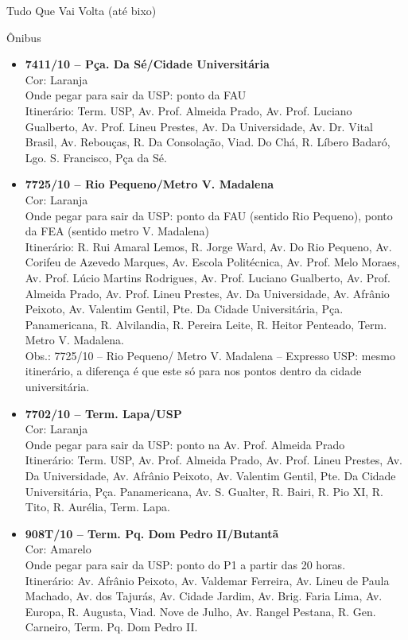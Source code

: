 \begin{secao}{Tudo Que Vai Volta (até bixo)}
\begin{subsecao}{Ônibus}
\begin{itemize}
	\item {\bf 7411/10 – Pça. Da Sé/Cidade Universitária}\\
	Cor: Laranja\\
	Onde pegar para sair da USP: ponto da FAU\\
	Itinerário: Term. USP, Av. Prof. Almeida Prado, Av. Prof. Luciano 
	Gualberto, Av. Prof. Lineu Prestes, Av. Da Universidade, Av. Dr. Vital 
	Brasil, Av. Rebouças, R. Da Consolação, Viad. Do Chá, R. Líbero Badaró,
	Lgo. S. Francisco, Pça da Sé.

	\item {\bf 7725/10 – Rio Pequeno/Metro V. Madalena}\\
	Cor: Laranja\\
	Onde pegar para sair da USP: ponto da FAU (sentido Rio Pequeno), ponto da
	FEA (sentido metro V. Madalena)\\
	Itinerário: R. Rui Amaral Lemos, R. Jorge Ward, Av. Do Rio Pequeno, Av.
	Corifeu de Azevedo Marques, Av. Escola Politécnica, Av. Prof. Melo Moraes,
	Av. Prof. Lúcio Martins Rodrigues, Av. Prof. Luciano Gualberto, Av. Prof.
	Almeida Prado, Av. Prof. Lineu Prestes, Av. Da Universidade, Av. Afrânio
	Peixoto, Av. Valentim Gentil, Pte. Da Cidade Universitária, Pça. 
	Panamericana, R. Alvilandia, R. Pereira Leite, R. Heitor Penteado, Term.
	Metro V. Madalena.\\

	Obs.: 7725/10 – Rio Pequeno/ Metro V. Madalena – Expresso USP: mesmo
	itinerário, a diferença é que este só para nos pontos dentro da cidade
	universitária.

	\item {\bf 7702/10 – Term. Lapa/USP}\\
	Cor: Laranja\\
	Onde pegar para sair da USP: ponto na Av. Prof. Almeida Prado\\
	Itinerário: Term. USP, Av. Prof. Almeida Prado, Av. Prof. Lineu Prestes,
	Av. Da Universidade, Av. Afrânio Peixoto, Av. Valentim Gentil, Pte. Da
	Cidade Universitária, Pça. Panamericana, Av. S. Gualter, R. Bairi, R. Pio
	XI, R. Tito, R. Aurélia, Term. Lapa.

	\item {\bf 908T/10 – Term. Pq. Dom Pedro II/Butantã}\\
	Cor: Amarelo\\
	Onde pegar para sair da USP: ponto do P1 a partir das 20 horas.\\
	Itinerário: Av. Afrânio Peixoto, Av. Valdemar Ferreira, Av. Lineu de Paula
	Machado, Av. dos Tajurás, Av. Cidade Jardim, Av. Brig. Faria Lima, Av. 
	Europa, R. Augusta, Viad. Nove de Julho, Av. Rangel Pestana, R. Gen. 
	Carneiro, Term. Pq. Dom Pedro II.
  

\end{itemize}
\end{subsecao}
\end{secao}
